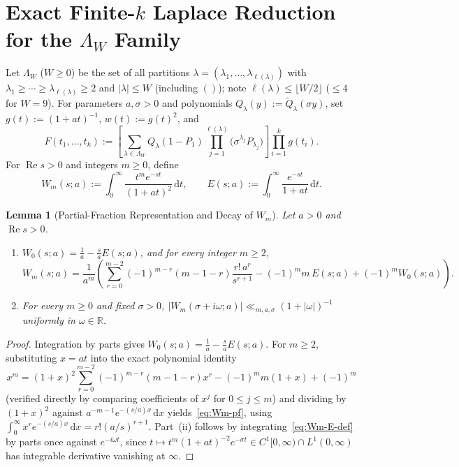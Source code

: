 \documentclass[11pt, reqno]{amsart}
\newtheorem{lemma}{Lemma}[section]
\theoremstyle{remark}
\numberwithin{equation}{section}
\DeclareMathOperator{\re}{Re}
\newcommand{\R}{\mathbb{R}}
\newcommand{\dd}{\,\mathrm{d}}
\begin{document}
\section{Exact Finite-\texorpdfstring{$k$}{k} Laplace Reduction for the \texorpdfstring{$\Lambda_W$}{Lambda\_W} Family}\label{sec:laplace}

Let $\Lambda_W$ ($W \ge 0$) be the set of all partitions $\lambda = (\lambda_1,\dots,\lambda_{\ell(\lambda)})$
with $\lambda_1 \ge \cdots \ge \lambda_{\ell(\lambda)} \ge 2$ and $|\lambda| \le W$ (including $()$); note
$\ell(\lambda) \le \lfloor W/2 \rfloor$ ($\le 4$ for $W=9$). For parameters $a, \sigma > 0$ and polynomials
$Q_\lambda(y) := \widetilde{Q}_\lambda(\sigma y)$, set $g(t) := (1+at)^{-1}$, $w(t) := g(t)^2$, and
\begin{equation}\label{eq:F-LambdaW}
F(t_1,\dots,t_k) := \left[\sum_{\lambda \in \Lambda_W} Q_\lambda(1 - P_1)
\prod_{j=1}^{\ell(\lambda)} \bigl(\sigma^{\lambda_j} P_{\lambda_j}\bigr)\right]
\prod_{i=1}^k g(t_i).
\end{equation}
For $\re s > 0$ and integers $m \ge 0$, define
\begin{equation}\label{eq:Wm-E-def}
W_m(s; a) := \int_0^\infty \frac{t^m e^{-st}}{(1+at)^2}\dd t,
\qquad
E(s; a) := \int_0^\infty \frac{e^{-st}}{1+at}\dd t.
\end{equation}

\begin{lemma}[Partial-Fraction Representation and Decay of $W_m$]\label{lem:Wm-pf}
Let $a > 0$ and $\re s > 0$.
\begin{enumerate}
\item[(i)] $W_0(s;a) = \frac{1}{a} - \frac{s}{a} E(s;a)$, and for every integer $m \ge 2$,
\begin{equation}\label{eq:Wm-pf}
W_m(s;a) = \frac{1}{a^m}\left(\sum_{r=0}^{m-2} (-1)^{m-r}(m-1-r)\frac{r!\,a^r}{s^{r+1}}
- (-1)^m m\, E(s;a) + (-1)^m W_0(s;a)\right).
\end{equation}
\item[(ii)] For every $m \ge 0$ and fixed $\sigma > 0$, $|W_m(\sigma + i\omega; a)| \ll_{m,a,\sigma} (1 + |\omega|)^{-1}$
uniformly in $\omega \in \R$.
\end{enumerate}
\end{lemma}

\begin{proof}
Integration by parts gives $W_0(s;a) = \frac{1}{a} - \frac{s}{a} E(s;a)$. For $m \ge 2$, substituting $x = a t$
into the exact polynomial identity
\[
x^m = (1+x)^2 \sum_{r=0}^{m-2} (-1)^{m-r}(m-1-r) x^r - (-1)^m m(1+x) + (-1)^m
\]
(verified directly by comparing coefficients of $x^j$ for $0 \le j \le m$) and dividing by $(1+x)^2$ against
$a^{-m-1} e^{-(s/a)x}\dd x$ yields~\eqref{eq:Wm-pf}, using $\int_0^\infty x^r e^{-(s/a)x}\dd x = r!(a/s)^{r+1}$.
Part~(ii) follows by integrating~\eqref{eq:Wm-E-def} by parts once against $e^{-i\omega t}$, since
$t \mapsto t^m (1+at)^{-2} e^{-\sigma t} \in C^1[0,\infty) \cap L^1(0,\infty)$ has integrable derivative
vanishing at $\infty$.
\end{proof}
\end{document}
